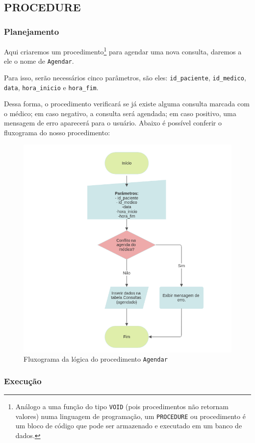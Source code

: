 %
%
\subsection{PROCEDURE}
\subsubsection{Planejamento}
Aqui criaremos um procedimento\footnote{Análogo a uma função do tipo \texttt{VOID} (pois procedimentos não retornam valores) numa linguagem de programação, um \texttt{PROCEDURE} ou procedimento é um bloco de código que pode ser armazenado e executado em um banco de dados\cite{Procedure}.} para agendar uma nova consulta, daremos a ele o nome de \texttt{Agendar}.

Para isso, serão necessários cinco parâmetros, são eles: \texttt{id\_paciente}, \texttt{id\_medico}, \texttt{data}, \texttt{hora\_inicio} e \texttt{hora\_fim}.

Dessa forma, o procedimento verificará se já existe alguma consulta marcada com o médico; em caso negativo, a consulta será agendada; em caso positivo, uma mensagem de erro aparecerá para o usuário. Abaixo é possível conferir o fluxograma do nosso procedimento:

\begin{figure}[H]
    \centering
    \includegraphics[width=0.75\linewidth]{Text/Proc/flowchart.png}
    \caption{Fluxograma da lógica do procedimento \texttt{Agendar}}
    \label{fig:agendar_flow}
\end{figure}

\newpage
\subsubsection{Execução}

